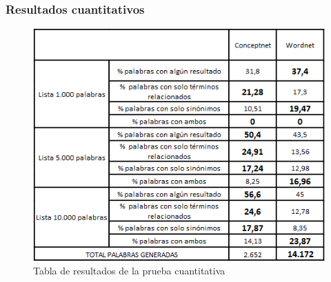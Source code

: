 \subsubsection{Resultados cuantitativos}
\label{cap:sec:pruebaCuantitativa}
\begin{figure}[!h]
\includegraphics[width=1.0\textwidth]{Imagenes/Bitmap/Capitulo4/tabla_cuantitativa}
\caption{Tabla de resultados de la prueba cuantitativa}
\label{fig:tabla_cuantitativa}
\end{figure}

